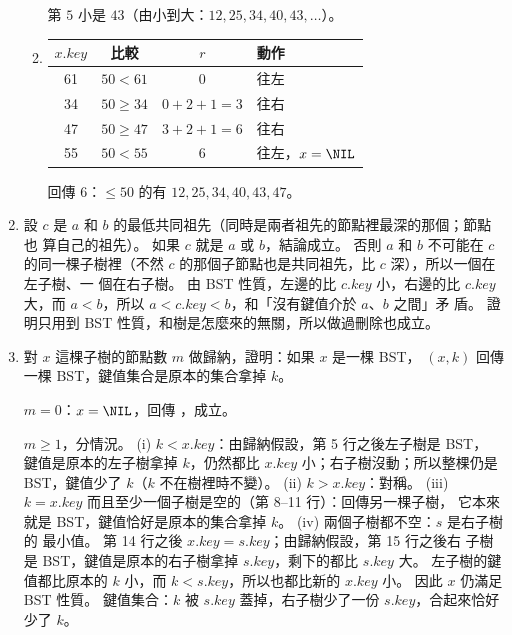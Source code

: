 \begin{enumerate}
\begin{enumerate}
第 $5$ 小是 $43$（由小到大：$12,\allowbreak 25,\allowbreak 34,\allowbreak 40,\allowbreak 43,\allowbreak \ldots$）。
\item
\begin{tabular}[t]{cccl}
\toprule
$x.\mathit{key}$ & 比較 & $r$ & 動作 \\
\midrule
61 & $50 < 61$ & 0 & 往左 \\
34 & $50 \ge 34$ & $0 + 2 + 1 = 3$ & 往右 \\
47 & $50 \ge 47$ & $3 + 2 + 1 = 6$ & 往右 \\
55 & $50 < 55$ & 6 & 往左，$x = \NIL$ \\
\bottomrule
\end{tabular}

回傳 $6$：$\le 50$ 的有 $12,\allowbreak 25,\allowbreak 34,\allowbreak 40,\allowbreak 43,\allowbreak 47$。
\end{enumerate}

\item 設 $c$ 是 $a$ 和 $b$ 的最低共同祖先（同時是兩者祖先的節點裡最深的那個；節點也
算自己的祖先）。 如果 $c$ 就是 $a$ 或 $b$，結論成立。 否則 $a$ 和 $b$ 不可能在 $c$
的同一棵子樹裡（不然 $c$ 的那個子節點也是共同祖先，比 $c$ 深），所以一個在左子樹、一
個在右子樹。 由 BST 性質，左邊的比 $c.\mathit{key}$ 小，右邊的比 $c.\mathit{key}$
大，而 $a < b$，所以 $a < c.\mathit{key} < b$，和「沒有鍵值介於 $a$、$b$ 之間」矛
盾。 證明只用到 BST 性質，和樹是怎麼來的無關，所以做過刪除也成立。

\item 對 $x$ 這棵子樹的節點數 $m$ 做歸納，證明：如果 $x$ 是一棵 BST，
$(x, k)$ 回傳一棵 BST，鍵值集合是原本的集合拿掉 $k$。

$m = 0$：$x = \NIL$，回傳 \NIL，成立。

$m \ge 1$，分情況。 (i) $k < x.\mathit{key}$：由歸納假設，第 5 行之後左子樹是 BST，
鍵值是原本的左子樹拿掉 $k$，仍然都比 $x.\mathit{key}$ 小；右子樹沒動；所以整棵仍是
BST，鍵值少了 $k$（$k$ 不在樹裡時不變）。 (ii) $k > x.\mathit{key}$：對稱。
(iii) $k = x.\mathit{key}$ 而且至少一個子樹是空的（第 8--11 行）：回傳另一棵子樹，
它本來就是 BST，鍵值恰好是原本的集合拿掉 $k$。 (iv) 兩個子樹都不空：$s$ 是右子樹的
最小值。 第 14 行之後 $x.\mathit{key} = s.\mathit{key}$；由歸納假設，第 15 行之後右
子樹是 BST，鍵值是原本的右子樹拿掉 $s.\mathit{key}$，剩下的都比 $s.\mathit{key}$
大。 左子樹的鍵值都比原本的 $k$ 小，而 $k < s.\mathit{key}$，所以也都比新的
$x.\mathit{key}$ 小。 因此 $x$ 仍滿足 BST 性質。 鍵值集合：$k$ 被 $s.\mathit{key}$
蓋掉，右子樹少了一份 $s.\mathit{key}$，合起來恰好少了 $k$。


\end{enumerate}
